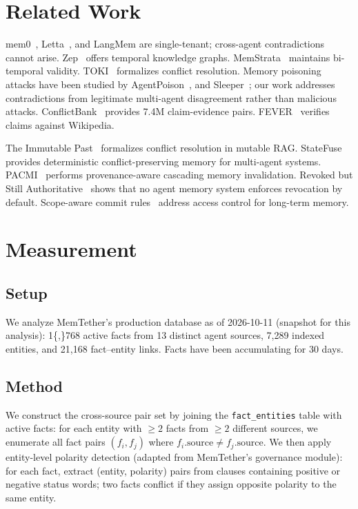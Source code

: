 \documentclass{article}
\begin{document}
\section{Related Work}
mem0~\cite{mem0}, Letta~\cite{letta}, and LangMem are single-tenant; cross-agent contradictions cannot arise. Zep~\cite{zep} offers temporal knowledge graphs. MemStrata~\cite{memstrata} maintains bi-temporal validity. TOKI~\cite{toki} formalizes conflict resolution. Memory poisoning attacks have been studied by AgentPoison~\cite{agentpoison}, and Sleeper~\cite{sleeper}; our work addresses contradictions from legitimate multi-agent disagreement rather than malicious attacks. ConflictBank~\cite{conflictbank} provides 7.4M claim-evidence pairs. FEVER~\cite{fever} verifies claims against Wikipedia.

The Immutable Past~\cite{immutablepast} formalizes conflict resolution in mutable RAG. StateFuse~\cite{statefuse} provides deterministic conflict-preserving memory for multi-agent systems. PACMI~\cite{pacmi} performs provenance-aware cascading memory invalidation. Revoked but Still Authoritative~\cite{revoked} shows that no agent memory system enforces revocation by default. Scope-aware commit rules~\cite{scopeaware} address access control for long-term memory.
\section{Measurement}
\label{sec:benchmark}
\label{sec:measure}

\subsection{Setup}
We analyze MemTether's production database as of 2026-10-11 (snapshot for this analysis): 1\{,\}768 active facts from 13 distinct agent sources, 7{,}289 indexed entities, and 21{,}168 fact--entity links. Facts have been accumulating for 30 days.

\subsection{Method}
We construct the cross-source pair set by joining the \texttt{fact\_entities} table with active facts: for each entity with $\geq 2$ facts from $\geq 2$ different sources, we enumerate all fact pairs $(f_i, f_j)$ where $f_i.\text{source} \neq f_j.\text{source}$. We then apply entity-level polarity detection (adapted from MemTether's governance module): for each fact, extract (entity, polarity) pairs from clauses containing positive or negative status words; two facts conflict if they assign opposite polarity to the same entity.
\end{document}
